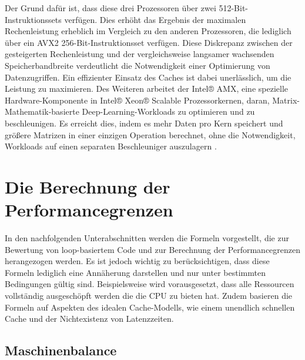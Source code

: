 \documentclass[sigconf,language=ngerman]{acmart}
\begin{document}
    Der Grund dafür ist, 
    dass diese drei Prozessoren über zwei 512-Bit-Instruktionssets verfügen. 
    Dies erhöht das Ergebnis der maximalen Rechenleistung erheblich im Vergleich zu den anderen Prozessoren, 
    die lediglich über ein AVX2 256-Bit-Instruktionsset verfügen.
    Diese Diskrepanz zwischen der gesteigerten Rechenleistung und der vergleichsweise langsamer wachsenden Speicherbandbreite 
    verdeutlicht die Notwendigkeit einer Optimierung von Datenzugriffen. 
    Ein effizienter Einsatz des Caches ist dabei unerlässlich, um die Leistung zu maximieren.
    Des Weiteren arbeitet der Intel® AMX, 
    eine spezielle Hardware-Komponente in Intel® Xeon® Scalable Prozessorkernen, 
    daran, 
    Matrix-Mathematik-basierte Deep-Learning-Workloads zu optimieren und zu beschleunigen. 
    Es erreicht dies, indem es mehr Daten pro Kern speichert und größere Matrizen in einer einzigen Operation berechnet, 
    ohne die Notwendigkeit, Workloads auf einen separaten Beschleuniger auszulagern \cite{TMUL}.

    \section{Die Berechnung der Performancegrenzen}
    In den nachfolgenden Unterabschnitten werden die Formeln vorgestellt, 
    die zur Bewertung von loop-basiertem Code und zur Berechnung der Performancegrenzen herangezogen werden. 
    Es ist jedoch wichtig zu berücksichtigen, dass diese Formeln lediglich eine Annäherung darstellen 
    und nur unter bestimmten Bedingungen gültig sind. Beispielsweise wird vorausgesetzt, 
    dass alle Ressourcen vollständig ausgeschöpft werden die die CPU zu bieten hat. 
    Zudem basieren die Formeln auf Aspekten des idealen Cache-Modells, 
    wie einem unendlich schnellen Cache und der Nichtexistenz von Latenzzeiten.

    \subsection{Maschinenbalance}
\end{document}
